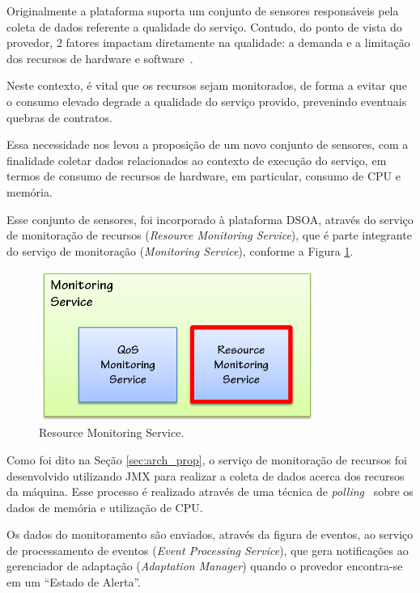 Originalmente a plataforma suporta um conjunto de sensores responsáveis pela coleta de dados referente a qualidade do serviço. Contudo, do ponto de vista do provedor, 2 fatores impactam diretamente na qualidade: a demanda e a limitação dos recursos de hardware e software~\cite{ye2011models}. 

Neste contexto, é vital que os recursos sejam monitorados, de forma a evitar que o consumo elevado degrade a qualidade do serviço provido, prevenindo eventuais quebras de contratos.

Essa necessidade nos levou a proposição de um novo conjunto de sensores, com a finalidade coletar dados relacionados ao contexto de execução do serviço, em termos de consumo de recursos de hardware, em particular, consumo de CPU e memória. 

Esse conjunto de sensores, foi incorporado à plataforma DSOA, através do serviço de monitoração de recursos (\textit{Resource Monitoring Service}), que é parte integrante do serviço de monitoração (\textit{Monitoring Service}), conforme a Figura \ref{fig:resc_module}.

\begin{figure}[htp]
\centering
\includegraphics[width=9cm]{chapters/chapter4/monitoring-service.png}
\caption[Resource Monitoring Service]{Resource Monitoring Service.}
\label{fig:resc_module}
\end{figure}

Como foi dito na Seção \ref{sec:arch_prop}, o serviço de monitoração de recursos foi desenvolvido utilizando JMX para realizar a coleta de dados acerca dos recursos da máquina. Esse processo é realizado através de uma técnica de \textit{polling}~\cite{patterson2005organizacao} sobre os dados de memória e utilização de CPU.

Os dados do monitoramento são enviados, através da figura de eventos, ao serviço de processamento de eventos (\textit{Event Processing Service}), que gera notificações ao gerenciador de adaptação (\textit{Adaptation Manager}) quando o provedor encontra-se em um ``Estado de Alerta''.

